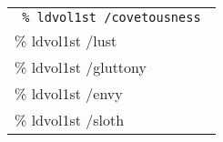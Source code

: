 {\tt
  \begin{tabular}{|l|}
    \hline \tt
    \% ldvol1st /covetousness  \\
    \% ldvol1st /lust          \\
    \% ldvol1st /gluttony      \\
    \% ldvol1st /envy          \\
    \% ldvol1st /sloth         \\
    \hline
  \end{tabular}
}